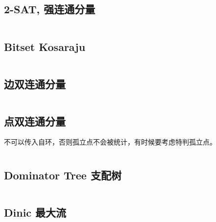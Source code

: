 \documentclass[titlepage, a4paper, 11pt]{article}
\begin{document}
\begin{spacing}{1.15}
				\subsection{2-SAT, 强连通分量}
					\inputminted{cpp}{src/TreeandGraph/2-sat.cpp}
				\subsection{Bitset Kosaraju}
					\inputminted{cpp}{src/TreeandGraph/kosaraju.cpp}
				\subsection{边双连通分量}
					\inputminted{cpp}{src/TreeandGraph/EBCC.cpp}
				\subsection{点双连通分量}
					不可以传入自环，否则孤立点不会被统计，有时候要考虑特判孤立点。
					\inputminted{cpp}{src/TreeandGraph/VBCC.cpp}
				\subsection{Dominator Tree 支配树}
					\inputminted{cpp}{src/TreeandGraph/支配树.cpp}
				\subsection{Dinic 最大流}
					
					\inputminted{cpp}{src/TreeandGraph/Dinic.cpp}
					\inputminted{cpp}{src/TreeandGraph/jianlyflow.cpp}

\end{spacing}
\end{document}
